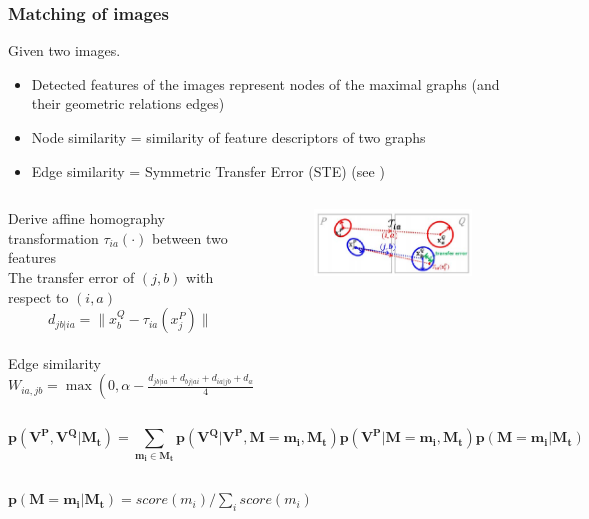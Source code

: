 \documentclass[hyperref={pdfpagelabels=false}]{beamer}
\begin{document}
\begin{frame}[allowframebreaks]
\frametitle{Matching of images}
Given two images.
\begin{itemize}
\item Detected features of the images represent nodes of the maximal graphs (and their geometric relations edges)
\item Node similarity  = similarity of feature descriptors of two graphs
\item Edge similarity = Symmetric Transfer Error (STE) (see \cite{MinsuChoRRW})
\end{itemize}

\begin{columns}[T]
\fontsize{10pt}{6}\selectfont
	\begin{column}{0.6\textwidth}
		Derive affine homography transformation $\tau_{ia}(\cdot)$ between two features\\
		\vspace{10pt}
		The transfer error of $(j,b)$ with respect to $(i,a)$
		$$d_{jb|ia}=\|x_b^Q-\tau_{ia}(x_j^P)\|$$\\
		Edge similarity $W_{ia,jb} = \max(0, \alpha - \frac{d_{jb|ia}+d_{bj|ai}+d_{ia|jb}+d_{ai|jb}}{4} )$
	\end{column}
	\begin{column}{0.4\textwidth}
		\begin{figure}
			\includegraphics[scale=0.5]{fig4.png}
		\end{figure}
	\end{column}
\end{columns}
	

\framebreak

\fontsize{7pt}{6}\selectfont

$$ \mathbf{p(V^P,V^Q|M_t) = \sum_{m_i\in M_t}p(V^Q|V^P,M=m_i,M_t)p(V^P|M=m_i, M_t)p(M=m_i|M_t)}$$

\begin{itemize}
  \begin{columns}[T]
    \begin{column}{0.75\textwidth}
	\item $\mathbf{p(M=m_i|M_t)} = score(m_i)/\sum_i score(m_i)$\\
    \end{column}
    

\end{columns}
\end{itemize}
\end{frame}
\end{document}
